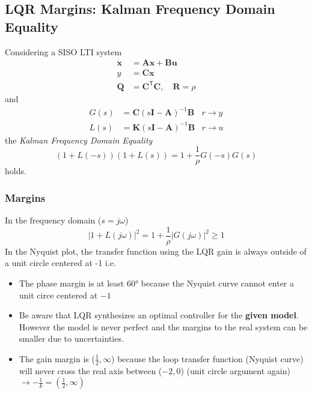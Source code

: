 \subsection{LQR Margins: Kalman Frequency Domain Equality}
Considering a SISO LTI system
\noindent\begin{align*}
    \dot{\mathbf{x}} & = \mathbf{Ax} + \mathbf{Bu}                                 \\
    y                & = \mathbf{Cx}                                               \\
    \mathbf{Q}       & = \mathbf{C}^{\mathsf{T}} \mathbf{C}, \quad \mathbf{R}=\rho
\end{align*}
and
\noindent\begin{align*}
    G(s) & = \mathbf{C}{(s \mathbf{I}-\mathbf{A})}^{-1}\mathbf{B} & r\to y \\
    L(s) & = \mathbf{K}{(s \mathbf{I}-\mathbf{A})}^{-1}\mathbf{B} & r\to u
\end{align*}
the \textit{Kalman Frequency Domain Equality}
\noindent\begin{equation*}
    (1+L(-s))(1+L(s)) = 1+\frac{1}{\rho}G(-s)G(s)
\end{equation*}
holds.

\subsubsection{Margins}
In the frequency domain ($s=j\omega$)
\noindent\begin{equation*}
    \left|1+L(j\omega)\right|^2=1+\frac1\rho\left|G(j\omega)\right|^2\geq1
\end{equation*}
In the Nyquist plot, the transfer function using the LQR gain is always outside of a unit circle centered at -1 i.e.
\begin{itemize}
    \item The phase margin is at least 60° because the Nyquist curve cannot enter a unit circe centered at $-1$ %
    \item Be aware that LQR synthesizes an optimal controller for the \textbf{given model}. However the model is never perfect and the margins to the real system can be smaller due to uncertainties.
    \item The gain margin is ($\frac{1}{2},\infty$) because the loop transfer function (Nyquist curve) will never cross the real axis between ($-2, 0$) (unit circle argument again)\newline $\to -\frac{1}{k} = (\frac{1}{2}, \infty)$
\end{itemize}

